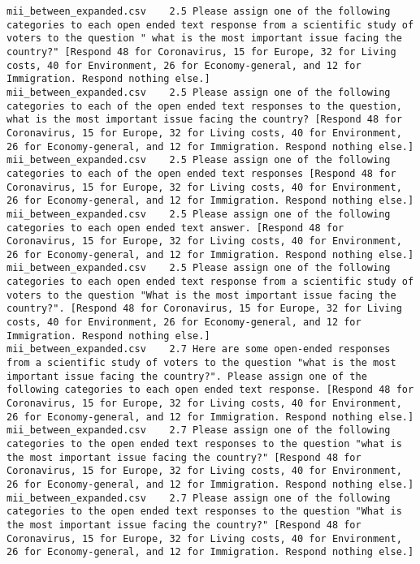 \begin{lstlisting}[label=lst:promptvariants]
mii_between_expanded.csv	2.5	Please assign one of the following categories to each open ended text response from a scientific study of voters to the question " what is the most important issue facing the country?" [Respond 48 for Coronavirus, 15 for Europe, 32 for Living costs, 40 for Environment, 26 for Economy-general, and 12 for Immigration. Respond nothing else.]
mii_between_expanded.csv	2.5	Please assign one of the following categories to each of the open ended text responses to the question, what is the most important issue facing the country? [Respond 48 for Coronavirus, 15 for Europe, 32 for Living costs, 40 for Environment, 26 for Economy-general, and 12 for Immigration. Respond nothing else.]
mii_between_expanded.csv	2.5	Please assign one of the following categories to each of the open ended text responses [Respond 48 for Coronavirus, 15 for Europe, 32 for Living costs, 40 for Environment, 26 for Economy-general, and 12 for Immigration. Respond nothing else.]
mii_between_expanded.csv	2.5	Please assign one of the following categories to each open ended text answer. [Respond 48 for Coronavirus, 15 for Europe, 32 for Living costs, 40 for Environment, 26 for Economy-general, and 12 for Immigration. Respond nothing else.]
mii_between_expanded.csv	2.5	Please assign one of the following categories to each open ended text response from a scientific study of voters to the question "What is the most important issue facing the country?". [Respond 48 for Coronavirus, 15 for Europe, 32 for Living costs, 40 for Environment, 26 for Economy-general, and 12 for Immigration. Respond nothing else.]
mii_between_expanded.csv	2.7	Here are some open-ended responses from a scientific study of voters to the question "what is the most important issue facing the country?". Please assign one of the following categories to each open ended text response. [Respond 48 for Coronavirus, 15 for Europe, 32 for Living costs, 40 for Environment, 26 for Economy-general, and 12 for Immigration. Respond nothing else.]
mii_between_expanded.csv	2.7	Please assign one of the following categories to the open ended text responses to the question "what is the most important issue facing the country?" [Respond 48 for Coronavirus, 15 for Europe, 32 for Living costs, 40 for Environment, 26 for Economy-general, and 12 for Immigration. Respond nothing else.]
mii_between_expanded.csv	2.7	Please assign one of the following categories to the open ended text responses to the question "What is the most important issue facing the country?" [Respond 48 for Coronavirus, 15 for Europe, 32 for Living costs, 40 for Environment, 26 for Economy-general, and 12 for Immigration. Respond nothing else.]

\end{lstlisting}
